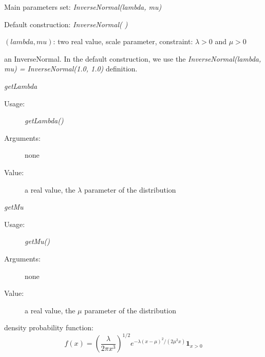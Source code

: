 \begin{description}

\item[Usage:]
\begin{description}
\item Main parameters set: \textit{InverseNormal(lambda, mu)}
\item Default construction: \textit{InverseNormal( )}
\end{description}

\item[Arguments:]  \rule{0pt}{1em}
\begin{description}
\item $(lambda, mu)$: two  real value, scale parameter, constraint: $\lambda > 0 $ and $\mu>0$
\end{description}

\item[Value:] an InverseNormal. In the default construction, we use the \textit{InverseNormal(lambda, mu) = InverseNormal(1.0, 1.0)} definition.

\item[Some methods:]  \rule{0pt}{1em}
\begin{description}

\item \textit{getLambda}
\begin{description}
\item[Usage:] \textit{getLambda()}
\item[Arguments:] none
\item[Value:]  a real value, the $\lambda$ parameter of the  distribution
\end{description}
\bigskip

\item \textit{getMu}
\begin{description}
\item[Usage:] \textit{getMu()}
\item[Arguments:] none
\item[Value:]  a real value, the $\mu$ parameter of the  distribution
\end{description}
\bigskip

\end{description}

\item[Details:]  \rule{0pt}{1em}
\begin{description}
\item density probability function:
\begin{equation}
f(x) = \displaystyle \left(\frac{\lambda}{2\pi x^3} \right)^{1/2}e^{-\lambda(x-\mu)^2/(2\mu^2x)} \mathbf{1}_{x>0}
\end{equation}
\end{description}

\item[Links:]  \rule{0pt}{1em}
\end{description}


